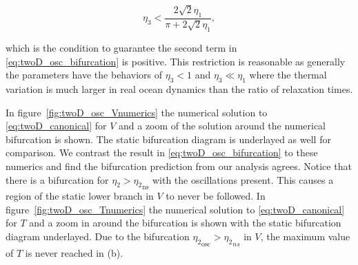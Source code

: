 \begin{equation*}
\eta_3 <\frac{2\sqrt{2}\eta_1}{\pi+2\sqrt{2}\eta_1},
\end{equation*}

which is the condition to guarantee the second term in \eqref{eq:twoD_osc_bifurcation} is positive. This restriction is reasonable as generally the parameters have the behaviors of $\eta_3<1$ and $\eta_3\ll \eta_1$ where the thermal variation is much larger in real ocean dynamics than the ratio of relaxation times.

In figure~\ref{fig:twoD_osc_Vnumerics} the numerical solution to \eqref{eq:twoD_canonical} for $V$ and a zoom of the solution around the numerical bifurcation is shown. The static bifurcation diagram is underlayed as well for comparison. We contrast the result in \eqref{eq:twoD_osc_bifurcation} to these numerics and find the bifurcation prediction from our analysis agrees. Notice that there is a bifurcation for $\eta_2>{\eta_2}_{\text{ns}}$ with the oscillations present. This causes a region of the static lower branch in $V$ to never be followed.
In figure~\ref{fig:twoD_osc_Tnumerics} the numerical solution to \eqref{eq:twoD_canonical} for $T$ and a zoom in around the bifurcation is shown with the static bifurcation diagram underlayed. Due to the bifurcation ${\eta_2}_{\text{osc}}>{\eta_2}_{ns}$ in $V$, the maximum value of $T$ is never reached in (b).

